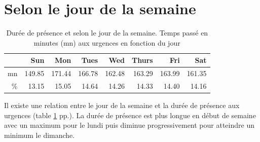 \documentclass[12pt,english,french,twoside]{book}\usepackage[]{graphicx}\usepackage[]{color}
\begin{document}

\section{Selon le jour de la semaine}

\begin{table}[ht]
\centering
\begin{tabular}{rrrrrrrr}
  \hline
 & Sun & Mon & Tues & Wed & Thurs & Fri & Sat \\ 
  \hline
mn & 149.85 & 171.44 & 166.78 & 162.48 & 163.29 & 163.99 & 161.35 \\ 
  \% & 13.15 & 15.05 & 14.64 & 14.26 & 14.33 & 14.40 & 14.16 \\ 
   \hline
\end{tabular}
\caption[Durée de présence et jour de la semaine]{Durée de présence et selon le jour de la semaine. Temps passé en minutes (mn) aux urgences en fonction du jour} 
\label{tab:jour_semaine}
\end{table}



Il existe une relation entre le jour de la semaine et la durée de présence aux urgences (table \ref{tab:jour_semaine} pp.\pageref{tab:jour_semaine}). La durée de présence est plus longue en début de semaine avec un maximum pour le lundi puis diminue progressivement pour atteindre un minimum le dimanche.
\end{document}
